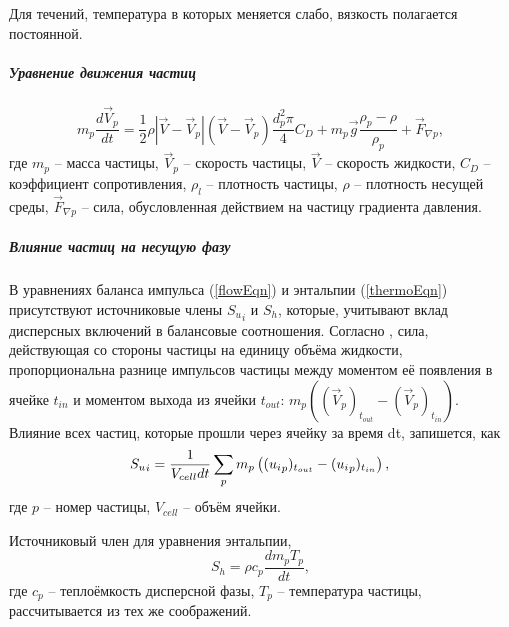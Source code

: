 				Для течений, температура в которых меняется слабо, вязкость полагается постоянной.
		\subparagraph{Уравнение движения частиц}
			\begin{equation}
				m_p \frac{d \vec{V}_p}{dt} = \frac{1}{2}\rho |\vec{V}-\vec{V}_p|(\vec{V}-\vec{V}_p)\frac{d_p^2 \pi}{4}C_D + m_p \vec{g}\frac{\rho_p-\rho}{\rho_p} + \vec{F}_{\nabla{p}},		
			\end{equation}
			где $m_p$ -- масса частицы, $\vec{V}_p$ -- скорость частицы, $\vec{V}$ -- скорость жидкости, $C_D$ -- коэффициент сопротивления, $\rho_l$ -- плотность частицы, $\rho$ -- плотность несущей среды, $\vec{F}_{\nabla{p}}$ -- сила, обусловленная действием на частицу градиента давления.
		\subparagraph{Влияние частиц на несущую фазу\\}
		
		В уравнениях баланса импульса (\ref{flowEqn}) и энтальпии (\ref{thermoEqn}) присутствуют источниковые члены ${S_u}_i$ и $S_h$, которые, учитывают вклад дисперсных включений в балансовые соотношения. Согласно \cite{Vallier}, сила, действующая со стороны частицы на единицу объёма жидкости, пропорциональна разнице импульсов частицы между моментом её появления в ячейке $t_{in}$ и моментом выхода из ячейки $t_{out}$: $m_p\left( (\vec{V}_p)_{t_{out}} - (\vec{V}_p)_{t_{in}}\right)$. Влияние всех частиц, которые прошли через ячейку за время dt, запишется, как
		\begin{equation}
			{S_u}_i = \frac{1}{V_{cell}dt} \sum_p m_p \left( ({u_i}_p)_{t_{out}} - ({u_i}_p)_{t_{in}}\right),\\
		\end{equation}
		где $p$ -- номер частицы, $V_{cell}$ -- объём ячейки.
		
		Источниковый член для уравнения энтальпии,
		\begin{equation}
			S_h = \rho c_p \frac{d m_p T_p}{dt},
		\end{equation}
		где $c_p$ -- теплоёмкость дисперсной фазы, $T_p$ -- температура частицы, рассчитывается из тех же соображений.
